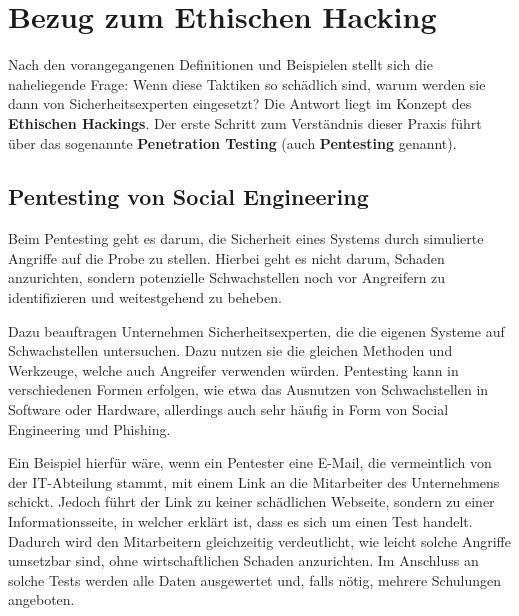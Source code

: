 \documentclass[12pt, a4paper, oneside]{scrartcl}
\begin{document}
\section{Bezug zum Ethischen Hacking}
Nach den vorangegangenen Definitionen und Beispielen stellt sich die naheliegende Frage: Wenn diese Taktiken
so schädlich sind, warum werden sie dann von Sicherheitsexperten eingesetzt? Die Antwort liegt im Konzept
des \textbf{Ethischen Hackings}. Der erste Schritt zum Verständnis dieser Praxis führt über das sogenannte
\textbf{Penetration Testing} (auch \textbf{Pentesting} genannt).

\subsection{Pentesting von Social Engineering}
Beim Pentesting geht es darum, die Sicherheit eines Systems durch simulierte Angriffe auf die 
Probe zu stellen. Hierbei geht es nicht darum, Schaden anzurichten, sondern potenzielle Schwachstellen
noch vor Angreifern zu identifizieren und weitestgehend zu beheben.
\par
Dazu beauftragen Unternehmen Sicherheitsexperten, die die eigenen Systeme auf Schwachstellen untersuchen.
Dazu nutzen sie die gleichen Methoden und Werkzeuge, welche auch Angreifer verwenden würden. Pentesting kann
in verschiedenen Formen erfolgen, wie etwa das Ausnutzen von Schwachstellen in Software oder Hardware,
allerdings auch sehr häufig in Form von Social Engineering und Phishing.
\par
Ein Beispiel hierfür wäre, wenn ein Pentester eine E-Mail, die vermeintlich von der IT-Abteilung stammt,
mit einem Link an die Mitarbeiter des Unternehmens schickt. Jedoch führt der Link zu keiner schädlichen Webseite, sondern
zu einer Informationsseite, in welcher erklärt ist, dass es sich um einen Test handelt. Dadurch wird 
den Mitarbeitern gleichzeitig verdeutlicht, wie leicht solche Angriffe umsetzbar sind, ohne wirtschaftlichen Schaden
anzurichten. Im Anschluss an solche Tests werden alle Daten ausgewertet und, falls nötig, mehrere Schulungen angeboten.
\end{document}
